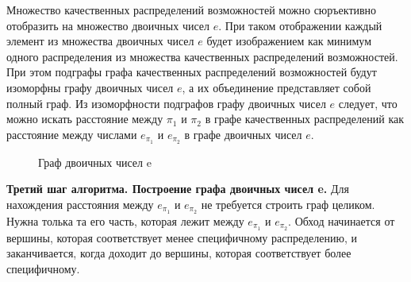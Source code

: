 \documentclass[a4paper, 14pt]{extarticle}
\begin{document}
Множество качественных распределений возможностей можно сюръективно отобразить на множество двоичных чисел $e$. При таком отображении каждый элемент из множества двоичных чисел $e$ будет изображением как минимум одного распределения из множества качественных распределений возможностей. При этом подграфы графа качественных распределений возможностей будут изоморфны графу двоичных чисел $e$, а их объединение представляет собой полный граф. Из изоморфности подграфов графу двоичных чисел $e$ следует, что можно искать расстояние между $\pi_1$ и $\pi_2$ в графе качественных распределений как расстояние между числами $e_{\pi_1}$ и $e_{\pi_2}$ в графе двоичных чисел $e$.
\begin{figure}[h!]
\caption{Граф двоичных чисел e}
\end{figure}

\textbf{Третий шаг алгоритма. Построение графа двоичных чисел e.} Для нахождения расстояния между $e_{\pi_1}$ и $e_{\pi_2}$ не требуется строить граф целиком. Нужна толька та его часть, которая лежит между $e_{\pi_1}$ и $e_{\pi_2}$. Обход начинается от вершины, которая соответствует менее специфичному распределению, и заканчивается, когда доходит до вершины, которая соответствует более специфичному.
\end{document}

